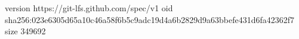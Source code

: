 version https://git-lfs.github.com/spec/v1
oid sha256:023e6305d65a10c46a58f6b5c9adc19d4a6b2829d9a63bbefe431d6fa42362f7
size 349692
